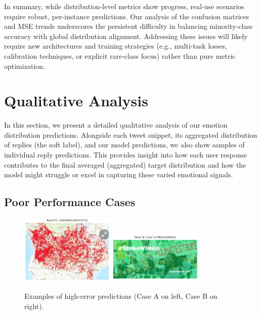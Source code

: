 In summary, while distribution-level metrics show progress, real-use scenarios require robust, per-instance predictions. Our analysis of the confusion matrices and MSE trends underscores the persistent difficulty in balancing minority-class accuracy with global distribution alignment. Addressing these issues will likely require new architectures and training strategies (e.g., multi-task losses, calibration techniques, or explicit rare-class focus) rather than pure metric optimization.



\section{Qualitative Analysis}

In this section, we present a detailed qualitative analysis of our emotion distribution predictions. Alongside each tweet snippet, its aggregated distribution of replies (the soft label), and our model predictions, we also show samples of individual reply predictions. This provides insight into how each user response contributes to the final averaged (aggregated) target distribution and how the model might struggle or excel in capturing these varied emotional signals.

\vspace{1em}
\subsection*{Poor Performance Cases}

\begin{figure}[ht]
    \centering
    \includegraphics[width=0.4\textwidth]{images/bad1.png} 
    \hfill
    \includegraphics[width=0.4\textwidth]{images/bad2.png}
    \caption{Examples of high-error predictions (Case A on left, Case B on right).}
    \label{fig:bad_cases}
\end{figure}

